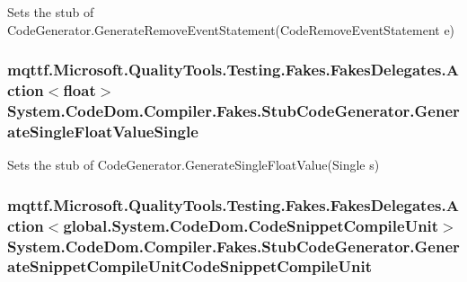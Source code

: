 Sets the stub of Code\-Generator.\-Generate\-Remove\-Event\-Statement(\-Code\-Remove\-Event\-Statement e)

\hypertarget{class_system_1_1_code_dom_1_1_compiler_1_1_fakes_1_1_stub_code_generator_aef6c34acfb2777b5da8e6009ae878634}{
\subsubsection[{Generate\-Single\-Float\-Value\-Single}]{\setlength{\rightskip}{0pt plus 5cm}mqttf.\-Microsoft.\-Quality\-Tools.\-Testing.\-Fakes.\-Fakes\-Delegates.\-Action$<$float$>$ System.\-Code\-Dom.\-Compiler.\-Fakes.\-Stub\-Code\-Generator.\-Generate\-Single\-Float\-Value\-Single}}\label{class_system_1_1_code_dom_1_1_compiler_1_1_fakes_1_1_stub_code_generator_aef6c34acfb2777b5da8e6009ae878634}


Sets the stub of Code\-Generator.\-Generate\-Single\-Float\-Value(\-Single s)

\hypertarget{class_system_1_1_code_dom_1_1_compiler_1_1_fakes_1_1_stub_code_generator_aa8f2fcf2e968d6587569baef3dbda6f9}{
\subsubsection[{Generate\-Snippet\-Compile\-Unit\-Code\-Snippet\-Compile\-Unit}]{\setlength{\rightskip}{0pt plus 5cm}mqttf.\-Microsoft.\-Quality\-Tools.\-Testing.\-Fakes.\-Fakes\-Delegates.\-Action$<$global.\-System.\-Code\-Dom.\-Code\-Snippet\-Compile\-Unit$>$ System.\-Code\-Dom.\-Compiler.\-Fakes.\-Stub\-Code\-Generator.\-Generate\-Snippet\-Compile\-Unit\-Code\-Snippet\-Compile\-Unit}}\label{class_system_1_1_code_dom_1_1_compiler_1_1_fakes_1_1_stub_code_generator_aa8f2fcf2e968d6587569baef3dbda6f9}


